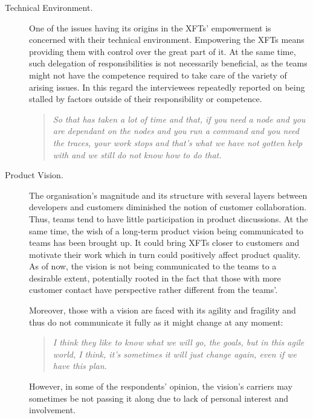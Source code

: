 \begin{description}
    \item [Technical Environment.] One of the issues having its origins in the \acp{XFT}' empowerment is concerned with their technical environment. Empowering the XFTs means providing them with control over the great part of it. At the same time, such delegation of responsibilities is not necessarily beneficial, as the teams might not have the competence required to take care of the variety of arising issues. In this regard the interviewees repeatedly reported on being stalled by factors outside of their responsibility or competence.
    
      \begin{quote}\itshape So that has taken a lot of time and that, if you need a node and you are dependant on the nodes and you run a command and you need the traces, your work stops and that's what we have not gotten help with and we still do not know how to do that.
      \end{quote}

    \item [Product Vision.] The organisation's magnitude and its structure with several layers between developers and customers diminished the notion of customer collaboration. Thus, teams tend to have little participation in product discussions. At the same time, the wish of a long-term product vision being communicated to teams has been brought up. It could bring \acp{XFT} closer to customers and motivate their work which in turn could positively affect product quality. As of now, the vision is not being communicated to the teams to a desirable extent, potentially rooted in the fact that those with more customer contact have perspective rather different from the teams'.

   Moreover, those with a vision are faced with its agility and fragility and thus do not communicate it fully as it might change at any moment:

      \begin{quote}\itshape I think they like to know what we will go, the goals, but in this agile world, I think, it’s sometimes it will just change again, even if we have this plan.
      \end{quote}

   However, in some of the respondents' opinion, the vision's carriers may sometimes be not passing it along due to lack of personal interest and involvement.

   

\end{description}
